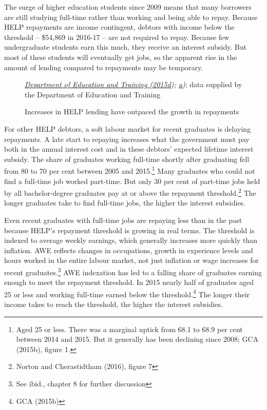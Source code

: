 \documentclass[embargoed]{grattan}
\begin{document}
The surge of higher education students since 2009 means that many borrowers are still studying full-time rather than working and being able to repay. Because HELP repayments are income contingent, debtors with income below the threshold -- \$54,869 in 2016-17 -- are not required to repay. Because few undergraduate students earn this much, they receive an interest subsidy. But most of these students will eventually get jobs, so the apparent rise in the amount of lending compared to repayments may be temporary.

\begin{figure}
\caption{Increases in HELP lending have outpaced the growth in repayments}\label{fig:fig7-increases-help-lending-outpaced-growth-repayments}



%
{\emph{\protect\hyperlink{_ENREF_27}{Department of Education and Training (2015d}); \protect\hyperlink{_ENREF_24}{a})}; data supplied by the Department of Education and Training}
\end{figure}

For other HELP debtors, a soft labour market for recent graduates is delaying repayments. A late start to repaying increases what the government must pay both in the annual interest cost and in these debtors' expected lifetime interest subsidy. The share of graduates working full-time shortly after graduating fell from 80 to 70 per cent between 2005 and 2015.\footnote{Aged 25 or less. There was a marginal uptick from 68.1 to 68.9 per cent between 2014 and 2015. But it generally has been declining since 2008; GCA (2015b), figure 1.} Many graduates who could not find a full-time job worked part-time. But only 30 per cent of part-time jobs held by all bachelor-degree graduates pay at or above the repayment threshold.\footnote{Norton and Cherastidtham (2016), figure 7} The longer graduates take to find full-time jobs, the higher the interest subsidies.

Even recent graduates with full-time jobs are repaying less than in the past because HELP's repayment threshold is growing in real terms. The threshold is indexed to average weekly earnings, which generally increases more quickly than inflation. AWE reflects changes in occupations, growth in experience levels and hours worked in the entire labour market, not just inflation or wage increases for recent graduates.\footnote{See ibid., chapter 8 for further discussion} AWE indexation has led to a falling share of graduates earning enough to meet the repayment threshold. In 2015 nearly half of graduates aged 25 or less and working full-time earned below the threshold.\footnote{GCA (2015b)} The longer their income takes to reach the threshold, the higher the interest subsidies.
\end{document}
